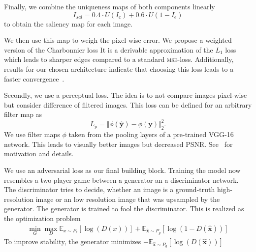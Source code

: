 \documentclass{scrartcl}
\begin{document}
Finally, we combine the uniqueness maps of both components linearly
\begin{equation}
  \label{eq:saliency}
  I_{sal} = 0.4 \cdot U(I_c) + 0.6 \cdot U(1 - I_e)
\end{equation}
to obtain the saliency map for each image.

We then use this map to weigh the pixel-wise error.
We propose a weighted version of the Charbonnier loss
It is a derivable approximation of the $L_1$ loss which leads to sharper edges compared to a standard \textsc{mse}-loss.
Additionally, results for our chosen architecture indicate that choosing this loss leads to a faster convergence~\cite{LapSRN}.

Secondly, we use a perceptual loss.
The idea is to not compare images pixel-wise but consider difference of filtered images.
This loss can be defined for an arbitrary filter map as
\begin{equation}
  \label{eq:perceptual-loss}
  L_p = \Vert \phi( \bm{\hat{y}} ) - \phi (\bm{y}) \Vert_2^2 .
\end{equation}
We use filter maps $\phi$ taken from the pooling layers of a pre-trained VGG-16~\cite{Vgg} network.
This leads to visually better images but decreased PSNR.
See~\cite{PerceptualLoss} for motivation and details.

We use an adversarial loss as our final building block.
Training the model now resembles a two-player game between a generator an a discriminator network.
The discriminator tries to decide, whether an image is a ground-truth high-resolution image or an low resolution image that was upsampled by the generator.
The generator is trained to fool the discriminator.
This is realized as the optimization problem~\cite{GAN}
\begin{align}
 \min_G \max_D \mathbb{E}_{x \sim P_r} \left[ \log (D({x})) \right] +
  \mathbb{E}_{\hat{\bm{x}} \sim P_g} \left[  \log (1 - D(\hat{\bm{x}})) \right]
\end{align}
To improve stability, the generator minimizes
\( - \mathbb{E}_{\hat{\bm{x}} \sim P_g} \left[ \log (D(\hat{\bm{x}})) \right]\)
\end{document}
